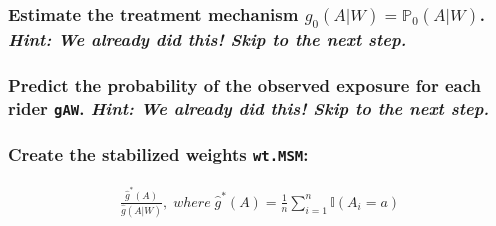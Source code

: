\documentclass{article}\usepackage[]{graphicx}\usepackage[]{xcolor}
\begin{document}
    \subsubsection{Estimate the treatment mechanism $g_0(A|W) = \mathbb{P}_0(A|W)$. 
    \textit{Hint: We already did this! Skip to the next step.}}
    
    \subsubsection{Predict the probability of the observed exposure for each rider \texttt{gAW}. 
    \textit{Hint: We already did this! Skip to the next step.}}
    
    \subsubsection{Create the stabilized weights \texttt{wt.MSM}:}
    
\begin{align*}
\frac{\hat{g}^*(A)}{\hat{g}(A|W)}, \; where \; \hat{g}^*(A) = \frac{1}{n}\sum_{i=1}^{n}\mathbb{I}(A_i=a)
\end{align*}
\end{document}
